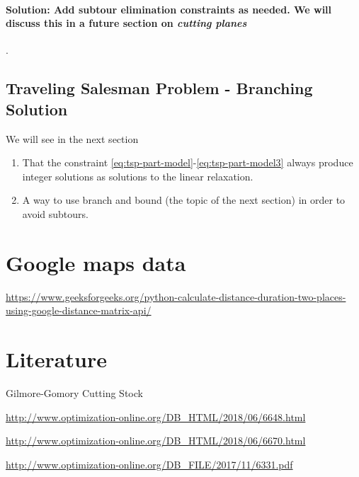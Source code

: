 \documentclass[../open-optimization/open-optimization.tex]{subfiles}
\begin{document}
\paragraph{Solution: Add subtour elimination constraints as needed.  We will discuss this in a future section on \emph{cutting planes}}.

\subsection{Traveling Salesman Problem - Branching Solution}
We will see in the next section
\begin{enumerate}
\item That the constraint \eqref{eq:tsp-part-model}-\eqref{eq:tsp-part-model3}  always produce integer solutions as solutions to the linear relaxation.
\item A way to use branch and bound (the topic of the next section) in order to avoid subtours.
\end{enumerate}


\section{Google maps data}
\url{https://www.geeksforgeeks.org/python-calculate-distance-duration-two-places-using-google-distance-matrix-api/}



\section{Literature}

Gilmore-Gomory Cutting Stock~\cite{Gilmore-Gomory}

\url{http://www.optimization-online.org/DB_HTML/2018/06/6648.html}

\url{http://www.optimization-online.org/DB_HTML/2018/06/6670.html}

\url{http://www.optimization-online.org/DB_FILE/2017/11/6331.pdf}
\end{document}
